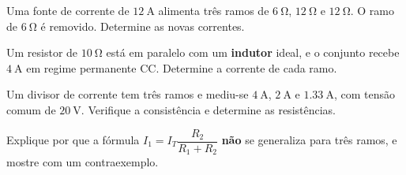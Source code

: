 \begin{questao}[2]{}

Uma fonte de corrente de $\SI{12}{\ampere}$ alimenta três ramos de
$\SI{6}{\ohm}$, $\SI{12}{\ohm}$ e $\SI{12}{\ohm}$. O ramo de
$\SI{6}{\ohm}$ é removido. Determine as novas correntes.


\end{questao}
\begin{questao}[2]{}

Um resistor de $\SI{10}{\ohm}$ está em paralelo com um \textbf{indutor} ideal,
e o conjunto recebe $\SI{4}{\ampere}$ em regime permanente CC. Determine a
corrente de cada ramo.


\end{questao}
\begin{questao}[2]{}

Um divisor de corrente tem três ramos e mediu-se $\SI{4}{\ampere}$,
$\SI{2}{\ampere}$ e $\SI{1.33}{\ampere}$, com tensão comum de
$\SI{20}{\volt}$. Verifique a consistência e determine as resistências.


\end{questao}
\begin{questao}[2]{}

Explique por que a fórmula $I_1=I_T\dfrac{R_2}{R_1+R_2}$ \textbf{não} se
generaliza para três ramos, e mostre com um contraexemplo.


\end{questao}

